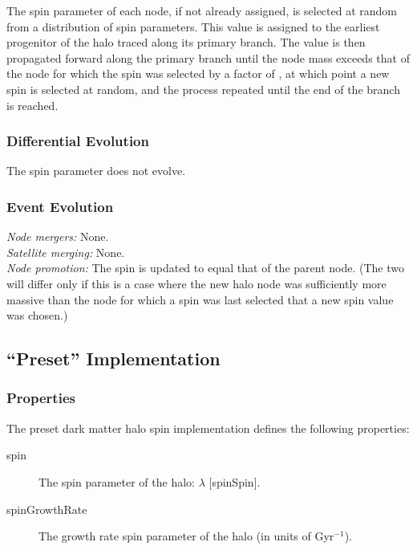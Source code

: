 The spin parameter of each node, if not already assigned, is selected at random from a distribution of spin parameters. This value is assigned to the earliest progenitor of the halo traced along its primary branch. The value is then propagated forward along the primary branch until the \gls{node} mass exceeds that of the \gls{node} for which the spin was selected by a factor of {\normalfont \ttfamily [randomSpinResetMassFactor]}, at which point a new spin is selected at random, and the process repeated until the end of the branch is reached. 

\subsubsection{Differential Evolution}

The spin parameter does not evolve.

\subsubsection{Event Evolution}

\noindent\emph{Node mergers:} None.\\

\noindent\emph{Satellite merging:} None.\\

\noindent\emph{Node promotion:} The spin is updated to equal that of the parent node. (The two will differ only if this is a case where the new halo \gls{node} was sufficiently more massive than the \gls{node} for which a spin was last selected that a new spin value was chosen.)\\

\subsection{``Preset'' Implementation}

\subsubsection{Properties}

The preset dark matter halo spin implementation defines the following properties:
\begin{description}
 \item [{\normalfont \ttfamily spin}] The spin parameter of the halo: $\lambda$ [{\normalfont \ttfamily spinSpin}].
 \item [{\normalfont \ttfamily spinGrowthRate}] The growth rate spin parameter of the halo (in units of Gyr$^{-1}$).
\end{description}

